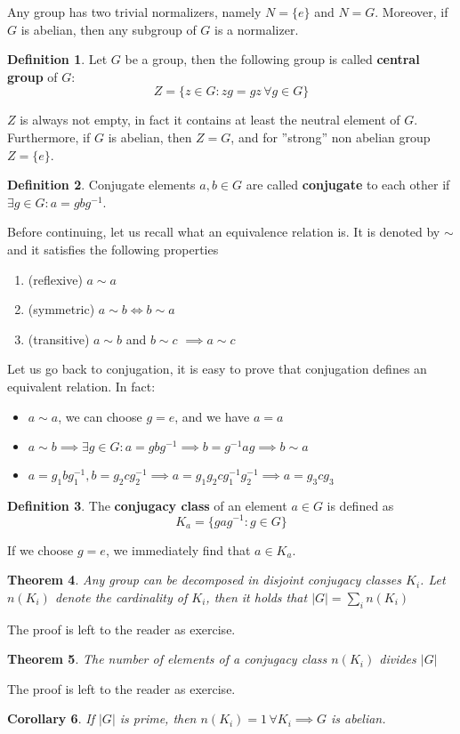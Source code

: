 \documentclass[12pt]{book}
\theoremstyle{plain}
\newtheorem{thm}{Theorem}[section]
\newtheorem{coro}[thm]{Corollary}
\theoremstyle{definition}
\newtheorem{dfn}[thm]{Definition}
\theoremstyle{remark}
\begin{document}
Any group has two trivial normalizers, namely $N=\{e\}$ and $N=G$. Moreover, if $G$ is abelian, then any subgroup of $G$ is a normalizer.
\begin{dfn}
Let $G$ be a group, then the following group is called \textbf{central group} of $G$:
\[Z = \{z\in G:zg=gz\, \forall g\in G\}\]
\end{dfn}
$Z$ is always not empty, in fact it contains at least the neutral element of $G$. Furthermore, if $G$ is abelian, then $Z=G$, and for ''strong'' non abelian group $Z=\{e\}$.
\begin{dfn}
Conjugate elements $a,b\in G$ are called \textbf{conjugate} to each other if $\exists g\in G:a=gbg^{-1}$.
\end{dfn}
Before continuing, let us recall what an equivalence relation is. It is denoted by $\sim$ and it satisfies the following properties
\begin{enumerate}
	\item (reflexive) $a \sim a$
	\item (symmetric) $a\sim b \iff b\sim a$
	\item (transitive) $a\sim b$ and $b\sim c$ $\implies a\sim c$
\end{enumerate}
Let us go back to conjugation, it is easy to prove that conjugation defines an equivalent relation. In fact:
\begin{itemize}
\item $a\sim a$, we can choose $g=e$, and we have $a=a$
\item $a\sim b \implies \exists g\in G: a=gbg^{-1} \implies b = g^{-1}ag \implies b\sim a$
\item $a=g_1bg^{-1}_1,b=g_2cg_2^{-1}\implies a = g_1g_2cg_1^{-1}g_2^{-1}\implies a = g_3cg_3$
\end{itemize}
\begin{dfn}
The \textbf{conjugacy class} of an element $a\in G$ is defined as
\[K_a = \{gag^{-1}:g\in G\}\]
\end{dfn} 
If we choose $g=e$, we immediately find that $a\in K_a$.
\begin{thm}
Any group can be decomposed in disjoint conjugacy classes $K_i$. Let $n(K_i)$ denote the cardinality of $K_i$, then it holds that $|G| = \sum_i n(K_i)$
\end{thm}
The proof is left to the reader as exercise.
\begin{thm}
The number of elements of a conjugacy class $n(K_i)$ divides $|G|$
\end{thm} 
The proof is left to the reader as exercise.
\begin{coro}
If $|G|$ is prime, then $n(K_i)=1\, \forall K_i \implies G$ is abelian.
\end{coro}
\end{document}
